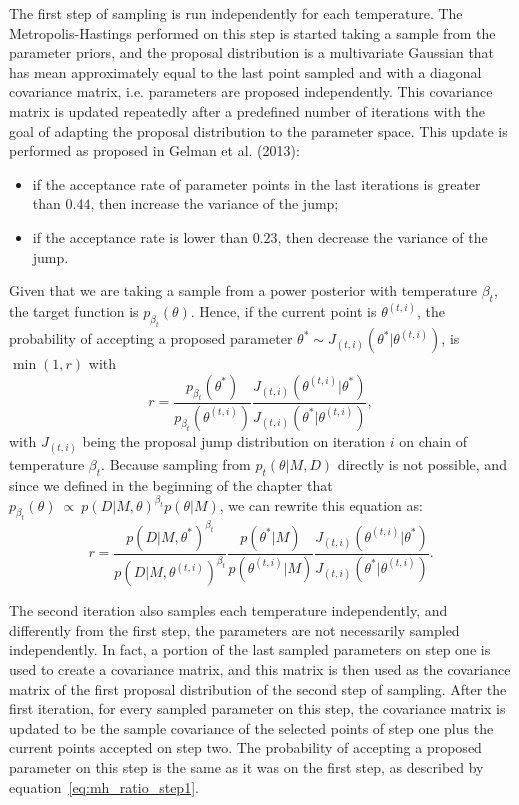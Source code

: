 The first step of sampling is run independently for each temperature. 
The Metropolis-Hastings performed on this step is started taking a 
sample from the parameter priors, and the proposal distribution is 
a multivariate Gaussian that has mean approximately equal to the last 
point sampled and with a diagonal covariance matrix, i.e. parameters are 
proposed independently. This covariance matrix is updated repeatedly 
after a predefined number of iterations with the goal of adapting the 
proposal distribution to the parameter space. This update is performed 
as proposed in Gelman et al. (2013): 
\begin{itemize}
\item{if the acceptance rate of parameter points in the last 
    iterations is greater than $0.44$, then increase the variance of the
    jump;}
\item{if the acceptance rate is lower than $0.23$, then decrease the 
    variance of the jump.}
\end{itemize}
Given that we are taking a sample from a power posterior with 
temperature $\beta_t$, the target function is 
$p_{\beta_t} (\theta)$. Hence, if the current point 
is $\theta^{(t, i)}$, the probability of accepting a proposed parameter 
$\theta^* \sim J_{(t, i)} (\theta^* | \theta^{(t, i)})$, is 
$\min (1, r)$ with
\begin{equation*}
    r = \frac{p_{\beta_t} (\theta^*)}
             {p_{\beta_t} (\theta^{(t, i)})}
        \frac{J_{(t, i)} (\theta^{(t, i)} | \theta^*)}
             {J_{(t, i)} (\theta^* | \theta^{(t, i)})},
\end{equation*}
with $J_{(t, i)}$ being the proposal jump distribution on iteration $i$ 
on chain of temperature $\beta_t$. Because sampling from $p_t(\theta | 
M, D)$ directly is not possible, and  since we defined in the beginning 
of the chapter that 
$p_{\beta_t} (\theta)~\propto~p (D|M, \theta)^{\beta_t} p (\theta | M)$,
we can rewrite this equation as:
\begin{equation}
    r = \frac{p (D | M, \theta^*)^{\beta_t}}
             {p (D | M, \theta^{(t, i)})^{\beta_t}}
        \frac{p (\theta^* | M)}
             {p (\theta^{(t, i)} | M)}
        \frac{J_{(t, i)} (\theta^{(t, i)} | \theta^*)}
             {J_{(t, i)} (\theta^* | \theta^{(t, i)})}.
    \label{eq:mh_ratio_step1}
\end{equation}

The second iteration also samples each temperature independently, and
differently from the first step, the parameters are not necessarily 
sampled independently. In fact, a portion of the last sampled parameters
on step one is used to create a covariance matrix, and this matrix is
then used as the covariance matrix of the first proposal distribution of 
the second step of sampling. After the first iteration, for every 
sampled parameter on this step, the covariance matrix is updated to be
the sample covariance of the selected points of step one plus the  
current points accepted on step two. The probability of accepting a 
proposed parameter on this step is the same  as it was on the first 
step, as described by equation~\ref{eq:mh_ratio_step1}.

